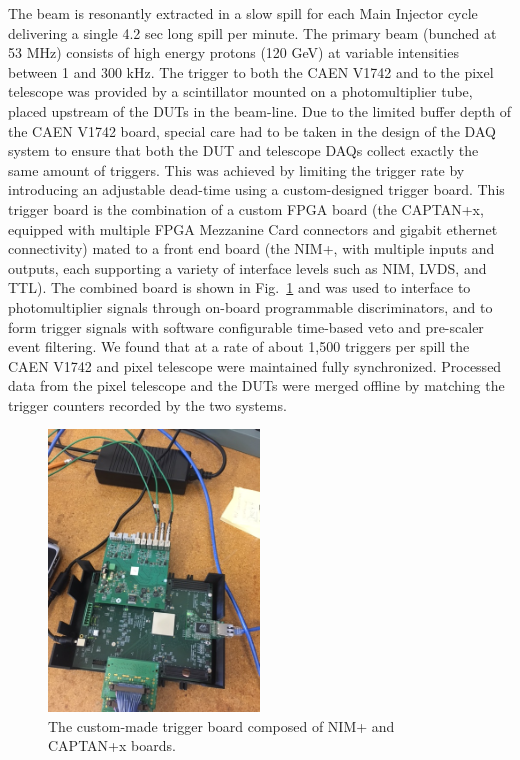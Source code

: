 \documentclass[preprint,1p]{elsarticle}
\begin{document}
The beam is resonantly extracted in a slow spill for each Main Injector cycle
delivering a single 4.2 sec long spill per minute. The primary beam (bunched at
53 MHz) consists of high energy protons (120 GeV) at variable intensities
between 1 and 300 kHz. The trigger to both the CAEN V1742 and to the pixel
telescope was provided by a scintillator mounted on a photomultiplier tube,
placed upstream of the DUTs in the beam-line. Due to the limited buffer depth of
the CAEN V1742 board, special care had to be taken in the design of the DAQ
system to ensure that both the DUT and telescope DAQs collect exactly the same
amount of triggers. This was achieved by limiting the trigger rate by
introducing an adjustable dead-time using a custom-designed trigger board. This
trigger board is the combination of a custom FPGA board (the CAPTAN+x, equipped
with multiple FPGA Mezzanine Card connectors and gigabit ethernet connectivity)
mated to a front end board (the NIM+, with multiple inputs and outputs, each
supporting a variety of interface levels such as NIM, LVDS, and TTL). The
combined board is shown in Fig.~\ref{fig:NIM+Captan} and was used to interface to
photomultiplier signals through on-board programmable discriminators, and to form
trigger signals with software configurable time-based veto and pre-scaler event
filtering. We found that at a rate of about 1,500 triggers per spill the CAEN
V1742 and pixel telescope were maintained fully synchronized. Processed data
from the pixel telescope and the DUTs were merged offline by matching the
trigger counters recorded by the two systems.

\begin{figure}[htbp] 
\centering
\includegraphics[width=0.5\textwidth, angle=270]{figs/CAPTAN_NIM_Plus.JPG} 
\caption{The custom-made trigger board composed of NIM+ and CAPTAN+x boards.} 
\label{fig:NIM+Captan} 
\end{figure} 
\end{document}
